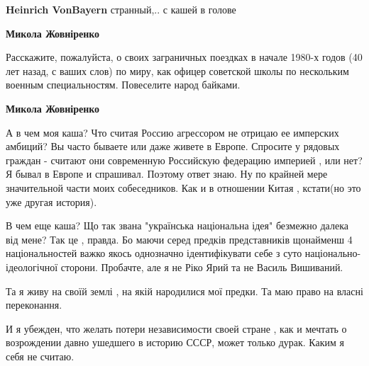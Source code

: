 \begin{itemize}
\begin{itemize}
 
\textbf{Heinrich VonBayern} странный,.. с кашей в голове

 
\textbf{Микола Жовніренко} 

Расскажите, пожалуйста, о своих заграничных поездках
в начале 1980-х годов (40 лет назад, с ваших слов) по миру, как офицер
советской школы по нескольким военным специальностям. Повеселите народ байками.

 
\textbf{Микола Жовніренко} 

А в чем моя каша? Что считая Россию агрессором не отрицаю ее имперских амбиций?
Вы часто бываете или даже живете в Европе.  Спросите у рядовых граждан -
считают они современную Российскую федерацию империей , или нет? Я бывал в
Европе и спрашивал. Поэтому ответ знаю. Ну по крайней мере значительной части
моих собеседников. Как и в отношении Китая , кстати(но это уже другая история).

В чем еще каша? Що так звана "українська національна ідея" безмежно далека від
мене? Так це , правда. Бо маючи серед предків представників щонайменш 4
національностей важко якось однозначно ідентифікувати себе з суто національно-
ідеологічної сторони. Пробачте, але я не Ріко Ярий та не Василь Вишиваний.

Та я живу на своїй землі , на якій народилися мої предки. Та маю право на
власні переконання.

И я убежден, что желать потери независимости своей стране , как и мечтать о
возрождении давно ушедшего в историю СССР, может только дурак. Каким я себя не
считаю.

 

\end{itemize}
\end{itemize}
